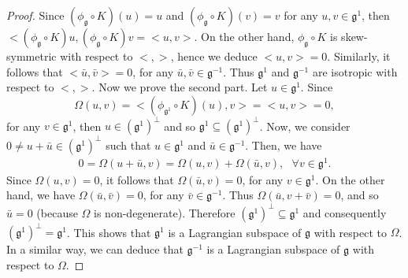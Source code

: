 \documentclass[10pt]{amsart}
\numberwithin{equation}{section}
\begin{document}
\begin{proof}
Since $({ \phi_\mathfrak{g}}\circ K)(u)=u$ and $({ \phi_\mathfrak{g}}\circ K)(v)=v$ for any $u,v\in\mathfrak{g}^1$, then $<({ \phi_\mathfrak{g}}\circ K)u,({ \phi_\mathfrak{g}}\circ K)v=<u,v>$. On the other hand, ${ \phi_\mathfrak{g}}\circ K$ is skew-symmetric with respect to $<,>$, hence we deduce $<u,v>=0$. Similarly, it follows that $<\bar{u},\bar{v}>=0$, for any $ \bar{u}, \bar{v}\in\mathfrak{g}^{-1}$. Thus $\mathfrak{g}^1$ and $\mathfrak{g}^{-1}$ are isotropic with respect to $<,>$. Now we prove the second part. Let $u\in \mathfrak{g}^1$. Since 
\[
\Omega(u,v)=<(\phi_{\mathfrak{g}^1}\circ K)(u),v>=<u,v>=0,
\]
for any $v\in\mathfrak{g}^1$, then
 $u\in (\mathfrak{g}^1)^\perp$ and so $\mathfrak{g}^1\subseteq (\mathfrak{g}^1)^\perp$. Now, we consider $0\neq u+\bar{u}\in (\mathfrak{g}^1)^\perp$ such that $u\in \mathfrak{g}^1$ and $\bar{u}\in \mathfrak{g}^{-1}$. Then, we have 
\begin{align*}
0=\Omega(u+\bar{u},v)=\Omega(u,v)+\Omega(\bar{u},v),\ \ \ \forall v\in \mathfrak{g}^1.
\end{align*}
Since $\Omega(u,v)=0$, it follows that $\Omega(\bar{u},v)=0$, for any $v\in\mathfrak{g}^1$. On the other hand, we have $\Omega(\bar{u},\bar{v})=0$, for any $\bar{v}\in \mathfrak{g}^{-1}$. Thus $\Omega(\bar{u},v+\bar{v})=0$, and so $\bar{u}=0$ (because $\Omega$ is non-degenerate). Therefore $(\mathfrak{g}^1)^\perp\subseteq \mathfrak{g}^1$ and consequently $(\mathfrak{g}^1)^\perp=\mathfrak{g}^1$. This shows that $\mathfrak{g}^1$ is a Lagrangian subspace of $\mathfrak{g}$ with respect to $\Omega$. In a similar way, we can deduce that $\mathfrak{g}^{-1}$ is a Lagrangian subspace of $\mathfrak{g}$ with respect to $\Omega$.


\end{proof}
\end{document}
